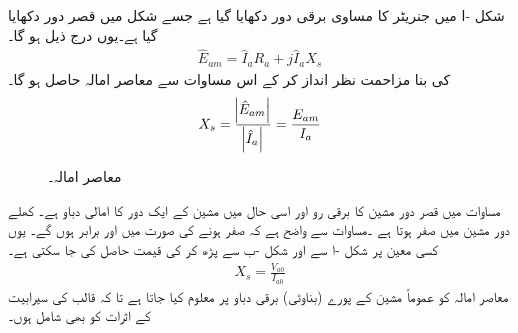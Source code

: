 شکل -ا  میں جنریٹر کا مساوی برقی دور دکھایا گیا ہے جسے  شکل   میں قصر دور دکھایا گیا ہے۔یوں درج ذیل ہو گا۔
\begin{align}
\hat{E}_{am}=\hat{I}_a R_a+j \hat{I}_a X_s
\end{align}
 کی بنا مزاحمت   نظر انداز کر کے اس مساوات سے معاصر امالہ حاصل ہو گا۔
\begin{align}\label{مساوات_معاصر_معاصر_امالہ_پیمائش}
X_s=\frac{\abs{\hat{E}_{am}}}{\abs{\hat{I}_a}}=\frac{E_{am}}{I_a}
\end{align}
%
\begin{figure}
\centering
\caption{معاصر امالہ۔}
\label{شکل_معاصر_امالہ_معاصر}
\end{figure}
مساوات  میں  قصر دور مشین کا برقی رو اور   اسی حال میں مشین کے ایک دور کا امالی دباو ہے۔ کھلے دور مشین میں  صفر ہوتا ہے ۔مساوات  سے واضح ہے کہ   صفر ہونے کی صورت میں   اور  برابر ہوں گے۔ یوں  کسی معین  پر شکل -ا سے   اور شکل -ب سے  پڑھ کر  کی قیمت حاصل کی جا سکتی ہے۔
\begin{align}\label{مساوات_معاصر_امالہ_پیمائش}
X_s=\frac{V_{a0}}{I_{a0}}
\end{align}
معاصر امالہ کو عموماً مشین کے پورے (بناوٹی) برقی دباو پر معلوم کیا جاتا ہے تا کہ قالب کی سیرابیت کے اثرات کو بھی شامل ہوں۔

